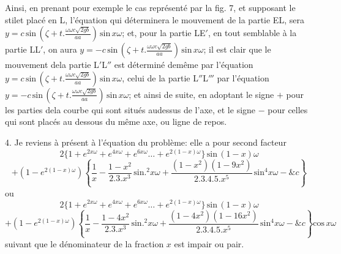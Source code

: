 \documentclass[11pt,a4paper]{article}
\begin{document}
Ainsi, en prenant pour exemple le cas représenté par la fig. 7, et
supposant le stilet placé en L, l'équation qui déterminera le mouvement
de la partie EL, sera $y = c\,\text{sin}\,(\zeta + t.\frac{\omega\omega c\sqrt{2gb}}{aa})\,\text{sin}\,x\omega$; et, pour la partie
LE$'$, en tout semblable à la partie LL$'$, on aura $y = -c\,\text{sin}\,(\zeta + t.\frac{\omega\omega c\sqrt{2gb}}{aa})\,\text{sin}\,x\omega$;
il est clair que le mouvement dela partie L$'$L$''$ est déterminé demême
par l'équation $y = c\,\text{sin}\,(\zeta + t.\frac{\omega\omega c\sqrt{2gb}}{aa})\,\text{sin}\,x\omega$, celui de la partie L$''$L$'''$ par
l'équation $y = -c\,\text{sin}\,(\zeta + t.\frac{\omega\omega c\sqrt{2gb}}{aa})\,\text{sin}\,x\omega$; et ainsi de suite, en adoptant
le signe $+$ pour les parties dela courbe qui sont situés audessus
de l'axe, et le signe $-$ pour celles qui sont placés au dessous
du même axe, ou ligne de repos.


4. Je reviens à présent à l'équation du problème: elle a pour second facteur
\[ 2\{1 + e^{2x\omega} + e^{4x\omega} + e^{6x\omega} \ldots + e^{2(1-x)\omega}\}\,\text{sin}\,(1-x)\omega \]
\[ + (1-e^{2(1-x)\omega})\left\{\frac{1}{x} - \frac{1-x^2}{2.3.x^3}\,\text{sin.}^2 x\omega + \frac{(1-x^2)(1-9x^2)}{2.3.4.5.x^5}\,\text{sin}^4 x\omega - \&c\right\} \]
ou
\[ 2\{1 + e^{2x\omega} + e^{4x\omega} + e^{6x\omega} \ldots + e^{2(1-x)\omega}\}\,\text{sin}\,(1-x)\omega \]
\[ + (1-e^{2(1-x)\omega})\left\{\frac{1}{x} - \frac{1-4x^2}{2.3.x^3}\,\text{sin.}^2 x\omega + \frac{(1-4x^2)(1-16x^2)}{2.3.4.5.x^5}\,\text{sin}^4 x\omega - \&c\right\}\text{cos}\,x\omega \]
suivant que le dénominateur de la fraction $x$ est impair ou pair.
\end{document}
